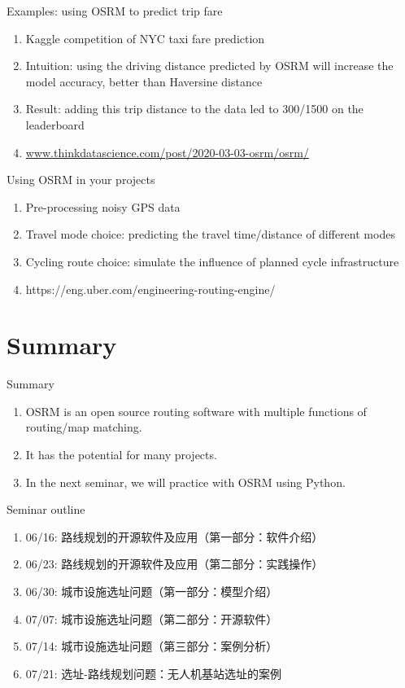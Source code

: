 \documentclass{beamer}
\begin{document}
\begin{frame}{Examples: using OSRM to predict trip fare}
\begin{enumerate}
\item Kaggle competition of NYC taxi fare prediction
\item Intuition: using the driving distance predicted by OSRM will increase the model accuracy, better than Haversine distance
\item Result: adding this trip distance to the data led to 300/1500 on the leaderboard
\item \url{www.thinkdatascience.com/post/2020-03-03-osrm/osrm/}
\end{enumerate}
\end{frame}

\begin{frame}{Using OSRM in your projects}
\begin{enumerate}
\item Pre-processing noisy GPS data 
\item Travel mode choice: predicting the travel time/distance of different modes
\item Cycling route choice: simulate the influence of planned cycle infrastructure
\item https://eng.uber.com/engineering-routing-engine/
\end{enumerate}
\end{frame}

\section{Summary}
\begin{frame}{Summary}
\begin{enumerate}
\item OSRM is an open source routing software with multiple functions of routing/map matching.
\item It has the potential for many projects.
\item In the next seminar, we will practice with OSRM using Python.
\end{enumerate}
\end{frame}

\begin{frame}{Seminar outline}
\begin{enumerate}
\item 06/16: 路线规划的开源软件及应用（第一部分：软件介绍）
\item 06/23: 路线规划的开源软件及应用（第二部分：实践操作）
\item 06/30: 城市设施选址问题（第一部分：模型介绍）
\item 07/07: 城市设施选址问题（第二部分：开源软件）
\item 07/14: 城市设施选址问题（第三部分：案例分析）
\item 07/21: 选址-路线规划问题：无人机基站选址的案例
\end{enumerate}
\end{frame}
\end{document}
